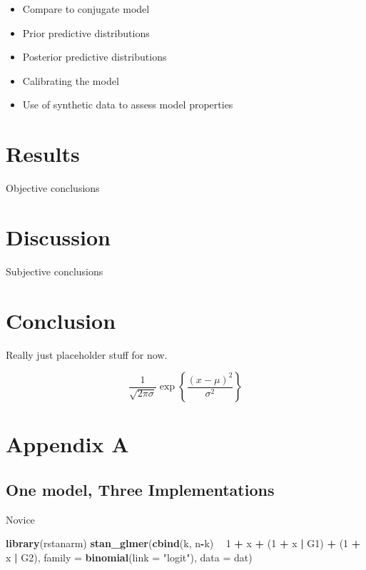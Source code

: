 \documentclass[
]{article}
\newenvironment{Shaded}{\begin{snugshade}}{\end{snugshade}}
\newcommand{\DataTypeTok}[1]{\textcolor[rgb]{0.13,0.29,0.53}{#1}}
\newcommand{\DecValTok}[1]{\textcolor[rgb]{0.00,0.00,0.81}{#1}}
\newcommand{\KeywordTok}[1]{\textcolor[rgb]{0.13,0.29,0.53}{\textbf{#1}}}
\newcommand{\NormalTok}[1]{#1}
\newcommand{\OperatorTok}[1]{\textcolor[rgb]{0.81,0.36,0.00}{\textbf{#1}}}
\newcommand{\StringTok}[1]{\textcolor[rgb]{0.31,0.60,0.02}{#1}}
\providecommand{\tightlist}{%
  \setlength{\itemsep}{0pt}\setlength{\parskip}{0pt}}
\begin{document}
\begin{itemize}
\tightlist
\item
  Compare to conjugate model
\item
  Prior predictive distributions
\item
  Posterior predictive distributions
\item
  Calibrating the model
\item
  Use of synthetic data to assess model properties
\end{itemize}

\hypertarget{results}{%
\section{Results}\label{results}}

Objective conclusions

\hypertarget{discussion}{%
\section{Discussion}\label{discussion}}

Subjective conclusions

\hypertarget{conclusion}{%
\section{Conclusion}\label{conclusion}}

Really just placeholder stuff for now.

\[
\frac{1}{\sqrt{2\pi\sigma}} \exp{\left\lbrace \frac{(x-\mu)^2}{\sigma^2} \right\rbrace}
\]

\hypertarget{appendix-a}{%
\section*{Appendix A}\label{appendix-a}}


\hypertarget{one-model-three-implementations}{%
\subsection{One model, Three Implementations}\label{one-model-three-implementations}}

Novice

\begin{Shaded}
\begin{Highlighting}[]
\KeywordTok{library}\NormalTok{(rstanarm)}
\KeywordTok{stan_glmer}\NormalTok{(}\KeywordTok{cbind}\NormalTok{(k, n}\OperatorTok{-}\NormalTok{k) }\OperatorTok{~}\StringTok{ }\DecValTok{1} \OperatorTok{+}\StringTok{ }\NormalTok{x }\OperatorTok{+}\StringTok{ }\NormalTok{(}\DecValTok{1} \OperatorTok{+}\StringTok{ }\NormalTok{x }\OperatorTok{|}\StringTok{ }\NormalTok{G1) }\OperatorTok{+}\StringTok{ }\NormalTok{(}\DecValTok{1} \OperatorTok{+}\StringTok{ }\NormalTok{x }\OperatorTok{|}\StringTok{ }\NormalTok{G2), }
           \DataTypeTok{family =} \KeywordTok{binomial}\NormalTok{(}\DataTypeTok{link =} \StringTok{"logit"}\NormalTok{),}
           \DataTypeTok{data =}\NormalTok{ dat)}
\end{Highlighting}
\end{Shaded}
\end{document}
